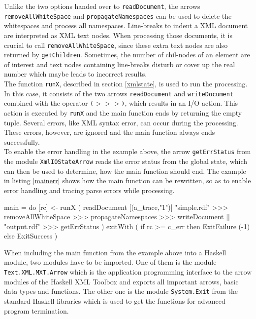 \documentclass[11pt,a4paper,headsepline, bibtotoc]{scrreprt}
\begin{document}
Unlike the two options handed over to \texttt{readDocument}, the arrows \texttt{removeAllWhiteSpace} and \texttt{propagateNamespaces} can be used to delete the whitespaces and process all namespaces. Line-breaks to indent a XML document are interpreted as XML text nodes. When processing those documents, it is crucial to call \texttt{removeAllWhiteSpace}, since these extra text nodes are also returned by \texttt{getChildren}. Sometimes, the number of chil-nodes of an element are of interest and text nodes containing line-breaks disturb or cover up the real number which maybe leads to incorrect results.\\
The function \texttt{runX}, described in section \ref{xmlstate}, is used to run the processing. In this case, it consists of the two arrows  \texttt{readDocument} and \texttt{writeDocument} combined with the operator {\tt ($>$$>$$>$)}, which results in an I/O action. This action is executed by \texttt{runX} and the main function ends by returning the empty tuple. Several errors, like XML syntax error, can occur during the processing. These errors, however, are ignored and the main function always ends successfully.\\
To enable the error handling in the example above, the arrow \texttt{getErrStatus} from the module \texttt{XmlIOStateArrow} reads the error status from the global state, which can then be used to determine, how the main function should end. The example in listing \ref{mainerr} shows how the main function can be rewritten, so as to enable error handling and tracing parse errors while processing.
\begin{code}[caption=Main Function with Error Handling,label=mainerr]
main
  = do
    [rc] <- runX ( readDocument [(a_trace,"1")] 
                                "simple.rdf"
                   >>>
                   removeAllWhiteSpace >>> propagateNamespaces
                   >>>
                   writeDocument [] "output.rdf"
                   >>>
                   getErrStatus
                 )
    exitWith ( if rc >= c_err
               then ExitFailure (-1)
               else ExitSuccess )
\end{code}
When including the main function from the example above into a Haskell module, two modules have to be imported. One of them is the module \texttt{Text.XML.MXT.Arrow} which is the application programming interface to the arrow modules of the Haskell XML Toolbox and exports all important arrows, basic data types and functions. The other one is the module \texttt{System.Exit} from the standard Haskell libraries which is used to get the functions for advanced program termination.\\
\end{document}
